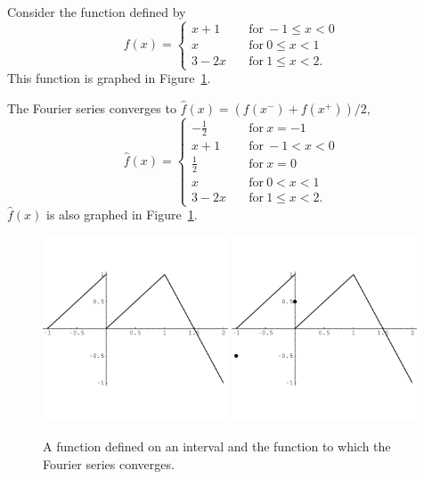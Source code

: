 \begin{Example}
  Consider the function defined by
  \[ f(x) =       \begin{cases}
    x+1 \quad &\mathrm{for}\ -1 \leq x < 0 \\
    x \quad &\mathrm{for}\ 0 \leq x < 1 \\
    3-2x \quad &\mathrm{for}\ 1 \leq x < 2.
  \end{cases}
  \]
  This function is graphed in Figure~\ref{uud12}.



  The Fourier series converges to $\hat{f}(x) = (f(x^-) + f(x^+))/2$, 
  \[ \hat{f}(x) = 
  \begin{cases}
    -\frac{1}{2} \quad &\mathrm{for}\ x = -1 \\
    x+1 \quad &\mathrm{for}\ -1 < x < 0 \\
    \frac{1}{2} \quad &\mathrm{for}\ x = 0 \\
    x \quad &\mathrm{for}\ 0 < x < 1 \\
    3-2x \quad &\mathrm{for}\ 1 \leq x < 2.
  \end{cases}
  \]
  $\hat{f}(x)$ is also graphed in Figure~\ref{uud12}.


  \begin{figure}[h!]
    \begin{center}
      \includegraphics[width=0.49\textwidth]{ode/fourier_series/uud1}
      \includegraphics[width=0.49\textwidth]{ode/fourier_series/uud2}
    \end{center}
    \caption{A function defined on an interval and 
      the function to which the Fourier series converges.}
    \label{uud12}
  \end{figure}



\end{Example}
